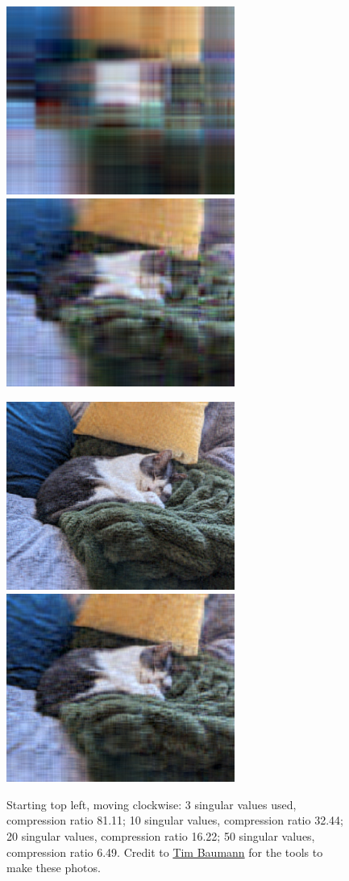 \documentclass[12pt]{article}
\numberwithin{equation}{subsection}
\numberwithin{figure}{subsection}
\theoremstyle{note}
\begin{document}
	\begin{figure}[h]
	\centering
	
	\includegraphics[width=75mm]{Images/leo3} \quad \includegraphics[width=75mm]{Images/leo10} 
	
	\vspace{5mm}
	
	\includegraphics[width=75mm]{Images/leo50} \quad \includegraphics[width=75mm]{Images/leo20} 
	
	\caption{ Starting top left, moving clockwise: 3 singular values used, compression ratio 81.11; 10 singular values, compression ratio 32.44; 20 singular values, compression ratio 16.22; 50 singular values, compression ratio 6.49. Credit to \href{https://timbaumann.info/svd-image-compression-demo/}{Tim Baumann} for the tools to make these photos.}
	
	\label{fig:leo}
	\end{figure}
\end{document}
